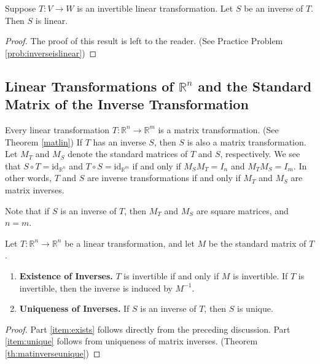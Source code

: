 \documentclass{ximera}
\renewcommand{\vec}[1]{{\bf #1}}
\newcommand{\RR}{\mathbb{R}}
\newcommand{\id}{\text{id}}
\begin{document}
\begin{theorem}\label{th:inverseislinear} Suppose $T:V\rightarrow W$ is an invertible linear transformation.  Let $S$ be an inverse of $T$.  Then $S$ is  linear.
\end{theorem}

\begin{proof} The proof of this result is left to the reader. (See Practice Problem \ref{prob:inverseislinear})
\end{proof}


\subsection*{Linear Transformations of $\RR^n$ and the Standard Matrix of the Inverse Transformation}

Every linear transformation $T:\RR^n\rightarrow\RR^m$ is a matrix transformation. (See Theorem \ref{matlin})  If $T$ has an inverse $S$, then $S$ is also a matrix transformation.  Let  $M_T$ and $M_S$ denote the standard matrices of $T$ and $S$, respectively.  We see that $S\circ T=\id_{\RR^n}$ and $T\circ S=\id_{\RR^m}$ if and only if $M_SM_T=I_{n}$ and $M_TM_S=I_{m}$.  In other words, $T$ and $S$ are inverse transformations if and only if $M_T$ and $M_S$ are matrix inverses.

Note that if $S$ is an inverse of $T$, then $M_T$ and $M_S$ are square matrices, and $n=m$. 

\begin{theorem}\label{th:existunique} Let $T:\RR^n\rightarrow \RR^n$ be a linear transformation, and let $M$ be the standard matrix of $T$.
  \begin{enumerate}
  \item \label{item:exists} {\bf Existence of Inverses.}  $T$ is invertible if and only if $M$ is invertible.  If $T$ is invertible, then the inverse is induced by $M^{-1}$.
  \item \label{item:unique}{\bf Uniqueness of Inverses.}  If $S$ is an inverse of $T$, then $S$ is unique.
  \end{enumerate}
\end{theorem}
\begin{proof}
Part \ref{item:exists} follows directly from the preceding discussion.  Part \ref{item:unique} follows from uniqueness of matrix inverses. (Theorem \ref{th:matinverseunique})
\end{proof}
\end{document}
